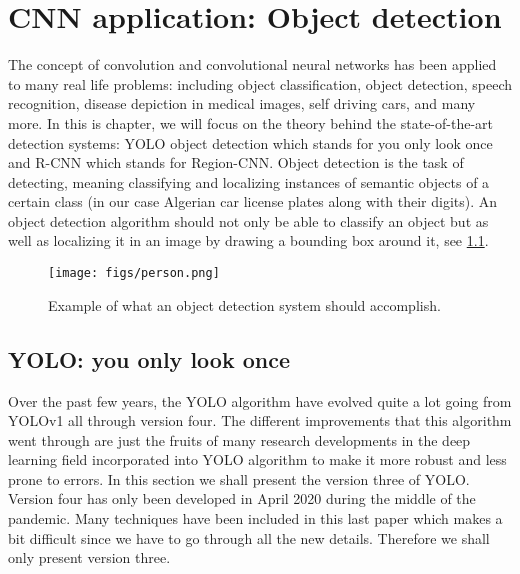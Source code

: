 
\chapter{CNN application: Object detection}
The concept of convolution and convolutional neural networks has been applied to many real life problems: including object classification,
object detection, speech recognition, disease depiction in medical images, self driving cars, and many more.
In this is chapter, we will focus on the theory behind the state-of-the-art detection systems: YOLO object detection which stands for you only look once
and R-CNN which stands for Region-CNN.
Object detection is the task of detecting, meaning classifying and localizing instances of semantic objects of a certain class (in our
case Algerian car license plates along with their digits). An object detection algorithm should not only be able to classify an object but as well as
localizing it in an image by drawing a bounding box around it, see \cref{fig:detection}.

\begin{figure}[!htbp]
  \centering
  \texttt{[image: figs/person.png]}
  \caption{Example of what an object detection system should accomplish.}\label{fig:detection}
\end{figure}

\section{YOLO: you only look once}
Over the past few years, the YOLO algorithm have evolved quite a lot going from YOLOv1 all through version four. The different
improvements that this algorithm went through are just the fruits of many research developments in the deep learning field incorporated into YOLO algorithm to
make it more robust and less prone to errors. In this section we shall present the version three of YOLO. Version four has only been developed in
April 2020 during the middle of the pandemic. Many techniques have been included in this last paper which makes a bit difficult since we have to go
through all the new details. Therefore we shall only present version three.

